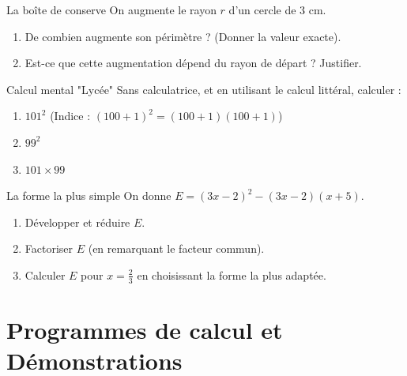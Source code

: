 \documentclass[a4paper]{book}
\begin{document}
    \begin{exerciceTitre}{La boîte de conserve}
        On augmente le rayon $r$ d'un cercle de 3 cm. 
        \begin{enumerate}
            \item De combien augmente son périmètre ? (Donner la valeur exacte).
            \item Est-ce que cette augmentation dépend du rayon de départ ? Justifier.
        \end{enumerate}
    \end{exerciceTitre}

    \begin{exerciceTitre}{Calcul mental "Lycée"}
        Sans calculatrice, et en utilisant le calcul littéral, calculer :
        \begin{enumerate}
            \item $101^2$ (Indice : $(100+1)^2 = (100+1)(100+1)$)
            \item $99^2$ 
            \item $101 \times 99$
        \end{enumerate}
    \end{exerciceTitre}
    
    \begin{exerciceTitre}{La forme la plus simple}
        On donne $E = (3x-2)^2 - (3x-2)(x+5)$.
        \begin{enumerate}
            \item Développer et réduire $E$.
            \item Factoriser $E$ (en remarquant le facteur commun).
            \item Calculer $E$ pour $x = \frac{2}{3}$ en choisissant la forme la plus adaptée.
        \end{enumerate}
    \end{exerciceTitre}
    
\newpage %
    
    \section{Programmes de calcul et Démonstrations}
    
\end{document}
